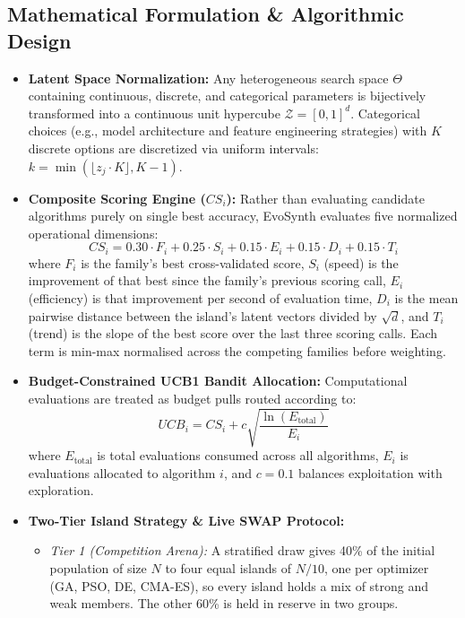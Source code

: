 \documentclass[11pt, a4paper]{article}
\begin{document}
\subsection{Mathematical Formulation \& Algorithmic Design}
\begin{itemize}[noitemsep, topsep=2pt]
    \item \textbf{Latent Space Normalization:} Any heterogeneous search space $\Theta$ containing continuous, discrete, and categorical parameters is bijectively transformed into a continuous unit hypercube $\mathcal{Z} = [0, 1]^d$. Categorical choices (e.g., model architecture and feature engineering strategies) with $K$ discrete options are discretized via uniform intervals: $k = \min(\lfloor z_j \cdot K \rfloor, K-1)$.
    \item \textbf{Composite Scoring Engine ($CS_i$):} Rather than evaluating candidate algorithms purely on single best accuracy, EvoSynth evaluates five normalized operational dimensions:
    \begin{equation}
        CS_i = 0.30 \cdot F_i + 0.25 \cdot S_i + 0.15 \cdot E_i + 0.15 \cdot D_i + 0.15 \cdot T_i
    \end{equation}
    where $F_i$ is the family's best cross-validated score, $S_i$ (speed) is the improvement of that best since the family's previous scoring call, $E_i$ (efficiency) is that improvement per second of evaluation time, $D_i$ is the mean pairwise distance between the island's latent vectors divided by $\sqrt{d}$, and $T_i$ (trend) is the slope of the best score over the last three scoring calls. Each term is min-max normalised across the competing families before weighting.
    \item \textbf{Budget-Constrained UCB1 Bandit Allocation:} Computational evaluations are treated as budget pulls routed according to:
    \begin{equation}
        UCB_i = CS_i + c \sqrt{\frac{\ln(E_{\text{total}})}{E_i}}
    \end{equation}
    where $E_{\text{total}}$ is total evaluations consumed across all algorithms, $E_i$ is evaluations allocated to algorithm $i$, and $c=0.1$ balances exploitation with exploration.
    \item \textbf{Two-Tier Island Strategy \& Live SWAP Protocol:} 
    \begin{itemize}[noitemsep]
        \item \textit{Tier 1 (Competition Arena):} A stratified draw gives 40\% of the initial population of size $N$ to four equal islands of $N/10$, one per optimizer (GA, PSO, DE, CMA-ES), so every island holds a mix of strong and weak members. The other 60\% is held in reserve in two groups.

\end{itemize}
\end{itemize}
\end{document}
